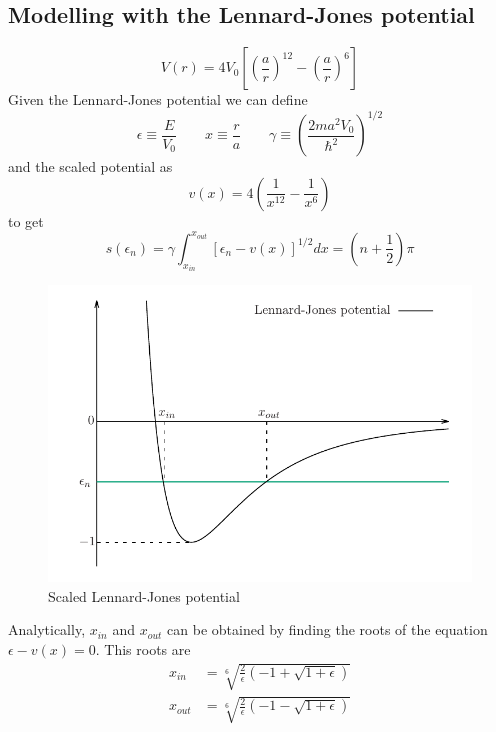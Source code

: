 \documentclass[11pt]{article}
\begin{document}
\subsection{Modelling with the Lennard-Jones potential}
\begin{equation*}
  V(r)= 4 V_0\left[\left(\frac{a}{r}\right)^{12}-\left(\frac{a}{r}\right)^{6}\right]
\end{equation*}
Given the Lennard-Jones potential we can define
\begin{equation*}
  \epsilon \equiv \frac{E}{V_0}\qquad x\equiv\frac{r}{a}\qquad \gamma \equiv \left(\frac{2ma^2V_0}{\hbar^2}\right)^{1/2}
\end{equation*}
and the scaled potential as
\begin{equation*}
  v(x)= 4\left(\frac{1}{x^{12}}-\frac{1}{x^6}\right)
\end{equation*}
to get
\begin{equation}
  s(\epsilon_n) = \gamma\int_{x_{in}}^{x_{out}} \left[\epsilon_n-v(x)\right]^{1/2} dx = \left(n+\frac{1}{2}\right)\pi
  \label{eqn:scaled_action}
\end{equation}
\begin{figure}[H]
  \centering
  \includegraphics[width=.8\linewidth]{potential-LJ}
  \caption{Scaled Lennard-Jones potential}
\label{fig:potential-Lj}
\end{figure}
Analytically, $x_{in}$ and $x_{out}$ can be obtained by finding the roots of the equation $\epsilon-v(x) = 0$. This roots are
\begin{align*}
  x_{in} &= \sqrt[6]{\frac{2}{\epsilon}\left(-1+\sqrt{1+\epsilon}\right)}\\
  x_{out} &= \sqrt[6]{\frac{2}{\epsilon}\left(-1-\sqrt{1+\epsilon}\right)}
\end{align*}
\end{document}
